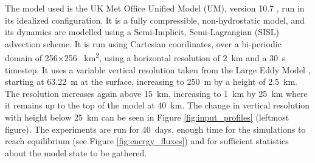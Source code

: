 \documentclass[11pt,a4paper]{article}
\begin{document}

The model used is the UK Met Office Unified Model (UM), version 10.7 \parencite{walters2017met}, run in its idealized configuration. It is a fully compressible, non-hydrostatic model, and its dynamics are modelled using a Semi-Implicit, Semi-Lagrangian (SISL) advection scheme. It is run using Cartesian coordinates, over a bi-periodic domain of 256$\times$256 \SI{}{km^2}, using a horizontal resolution of \SI{2}{km} and a \SI{30}{s} timestep. It uses a variable vertical resolution taken from the Large Eddy Model \parencite{petch2001sensitivity}, starting at \SI{63.22}{m} at the surface, increasing to \SI{250}{m} by a height of \SI{2.5}{km}. The resolution increases again above \SI{15}{km}, increasing to \SI{1}{km} by \SI{25}{km} where it remains up to the top of the model at \SI{40}{km}. The change in vertical resolution with height below \SI{25}{km} can be seen in Figure \ref{fig:input_profiles} (leftmost figure).
The experiments are run for \SI{40}{days}, enough time for the simulations to reach equilibrium (see Figure \ref{fig:energy_fluxes}) and for sufficient statistics about the model state to be gathered. 
\end{document}
